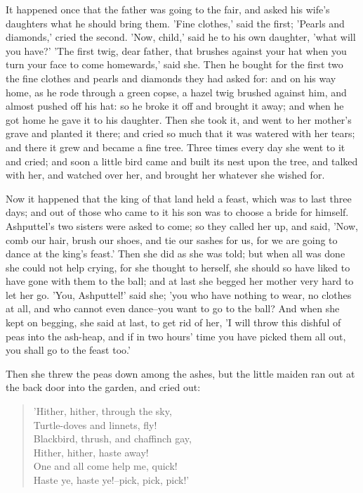 \documentclass[12pt]{book}
\begin{document}
It happened once that the father was going to the fair, and asked his
wife's daughters what he should bring them. 'Fine clothes,' said the
first; 'Pearls and diamonds,' cried the second. 'Now, child,' said he
to his own daughter, 'what will you have?' 'The first twig, dear
father, that brushes against your hat when you turn your face to come
homewards,' said she. Then he bought for the first two the fine
clothes and pearls and diamonds they had asked for: and on his way
home, as he rode through a green copse, a hazel twig brushed against
him, and almost pushed off his hat: so he broke it off and brought it
away; and when he got home he gave it to his daughter. Then she took
it, and went to her mother's grave and planted it there; and cried so
much that it was watered with her tears; and there it grew and became
a fine tree. Three times every day she went to it and cried; and soon
a little bird came and built its nest upon the tree, and talked with
her, and watched over her, and brought her whatever she wished for.

Now it happened that the king of that land held a feast, which was to
last three days; and out of those who came to it his son was to choose
a bride for himself. Ashputtel's two sisters were asked to come; so
they called her up, and said, 'Now, comb our hair, brush our shoes,
and tie our sashes for us, for we are going to dance at the king's
feast.' Then she did as she was told; but when all was done she could
not help crying, for she thought to herself, she should so have liked
to have gone with them to the ball; and at last she begged her mother
very hard to let her go. 'You, Ashputtel!' said she; 'you who have
nothing to wear, no clothes at all, and who cannot even dance--you
want to go to the ball? And when she kept on begging, she said at
last, to get rid of her, 'I will throw this dishful of peas into the
ash-heap, and if in two hours' time you have picked them all out, you
shall go to the feast too.'

Then she threw the peas down among the ashes, but the little maiden
ran out at the back door into the garden, and cried out:

\begin{verse}
 'Hither, hither, through the sky,\\
  Turtle-doves and linnets, fly!\\
  Blackbird, thrush, and chaffinch gay,\\
  Hither, hither, haste away!\\
  One and all come help me, quick!\\
  Haste ye, haste ye!--pick, pick, pick!'
\end{verse}
\end{document}
